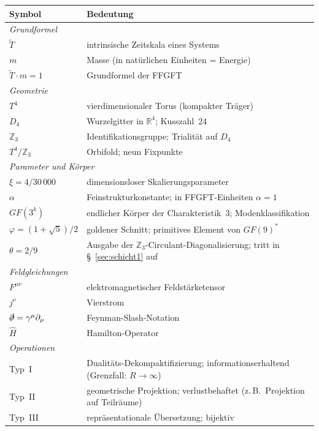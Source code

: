 \medskip
\begin{tabular}{@{}lp{11cm}@{}}
\toprule
\textbf{Symbol} & \textbf{Bedeutung} \\
\midrule
\multicolumn{2}{l}{\textit{Grundformel}} \\
$\tilde{T}$ & intrinsische Zeitskala eines Systems \\
$m$ & Masse (in natürlichen Einheiten = Energie) \\
$\tilde{T}\cdot m=1$ & Grundformel der FFGFT \\
\midrule
\multicolumn{2}{l}{\textit{Geometrie}} \\
$T^4$ & vierdimensionaler Torus (kompakter Träger) \\
$D_4$ & Wurzelgitter in $\mathbb{R}^4$; Kusszahl~24 \\
$\mathbb{Z}_3$ & Identifikationsgruppe; Trialität auf $D_4$ \\
$T^4/\mathbb{Z}_3$ & Orbifold; neun Fixpunkte \\
\midrule
\multicolumn{2}{l}{\textit{Parameter und Körper}} \\
$\xi=4/30\,000$ & dimensionsloser Skalierungsparameter \\
$\alpha$ & Feinstrukturkonstante; in FFGFT-Einheiten $\alpha=1$ \\
$GF(3^k)$ & endlicher Körper der Charakteristik~3; Modenklassifikation \\
$\varphi=(1{+}\sqrt5)/2$ & goldener Schnitt; primitives Element von $GF(9)^*$ \\
$\theta=2/9$ & Ausgabe der $\mathbb{Z}_3$-Circulant-Diagonalisierung; tritt in §~\ref{sec:schicht1} auf \\
\midrule
\multicolumn{2}{l}{\textit{Feldgleichungen}} \\
$F^{\mu\nu}$ & elektromagnetischer Feldstärketensor \\
$j^\nu$ & Vierstrom \\
$\slashed\partial=\gamma^\mu\partial_\mu$ & Feynman-Slash-Notation \\
$\hat{H}$ & Hamilton-Operator \\
\midrule
\multicolumn{2}{l}{\textit{Operationen}} \\
Typ~I & Dualitäts-Dekompaktifizierung; informationserhaltend (Grenzfall: $R\to\infty$) \\
Typ~II & geometrische Projektion; verlustbehaftet (z.\,B.\ Projektion auf Teilräume) \\
Typ~III & repräsentationale Übersetzung; bijektiv \\
\bottomrule
\end{tabular}


